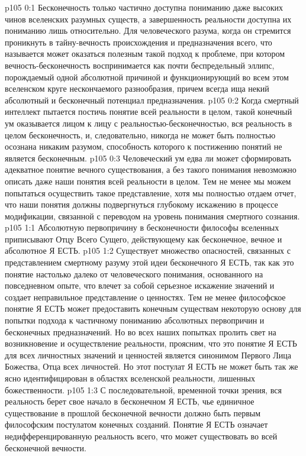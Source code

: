 \author{Мелхиседек}
\vs p105 0:1 Бесконечность только частично доступна пониманию даже высоких чинов вселенских разумных существ, а завершенность реальности доступна их пониманию лишь относительно. Для человеческого разума, когда он стремится проникнуть в тайну\hyp{}вечность происхождения и предназначения всего, что называется  может оказаться полезным такой подход к проблеме, при котором вечность\hyp{}бесконечность воспринимается как почти беспредельный эллипс, порождаемый одной абсолютной причиной и функционирующий во всем этом вселенском круге нескончаемого разнообразия, причем всегда ища некий абсолютный и бесконечный потенциал предназначения.
\vs p105 0:2 Когда смертный интеллект пытается постичь понятие всей реальности в целом, такой конечный ум оказывается лицом к лицу с реальностью\hyp{}бесконечностью, вся реальность в целом  бесконечность, и, следовательно, никогда не может быть полностью осознана никаким разумом, способность которого к постижению понятий не является бесконечным.
\vs p105 0:3 Человеческий ум едва ли может сформировать адекватное понятие вечного существования, а без такого понимания невозможно описать даже наши понятия всей реальности в целом. Тем не менее мы можем попытаться осуществить такое представление, хотя мы полностью отдаем отчет, что наши понятия должны подвергнуться глубокому искажению в процессе модификации, связанной с переводом на уровень понимания смертного сознания.
\vs p105 1:1 Абсолютную первопричину в бесконечности философы вселенных приписывают Отцу Всего Сущего, действующему как бесконечное, вечное и абсолютное Я ЕСТЬ.
\vs p105 1:2 Существует множество опасностей, связанных с представлением смертному разуму этой идеи бесконечного Я ЕСТЬ, так как это понятие настолько далеко от человеческого понимания, основанного на повседневном опыте, что влечет за собой серьезное искажение значений и создает неправильное представление о ценностях. Тем не менее философское понятие Я ЕСТЬ может предоставить конечным существам некоторую основу для попытки подхода к частичному пониманию абсолютных первопричин и бесконечных предназначений. Но во всех наших попытках пролить свет на возникновение и осуществление реальности, проясним, что это понятие Я ЕСТЬ для всех личностных значений и ценностей является синонимом Первого Лица Божества, Отца всех личностей. Но этот постулат Я ЕСТЬ не может быть так же ясно идентифицирован в областях вселенской реальности, лишенных божественности.
\vs p105 1:3 \pc {} С последовательной, временной точки зрения, вся реальность берет свое начало в бесконечном Я ЕСТЬ, чье единичное существование в прошлой бесконечной вечности должно быть первым философским постулатом конечных созданий. Понятие Я ЕСТЬ означает  недифференцированную реальность всего, что может существовать во всей бесконечной вечности.
